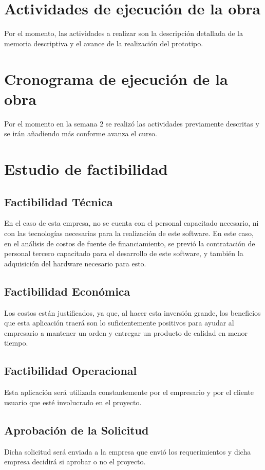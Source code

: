 \documentclass[conference]{IEEEtran}
\begin{document}
\section{Actividades de ejecución de la obra}
Por el momento, las actividades a realizar son la descripción detallada de la memoria descriptiva y el avance de la realización del prototipo.

\section{Cronograma de ejecución de la obra}
Por el momento en la semana 2 se realizó las actividades previamente descritas y se irán añadiendo más conforme avanza el curso.

\section{Estudio de factibilidad}
\subsection{Factibilidad Técnica}
En el caso de esta empresa, no se cuenta con el personal capacitado necesario, ni con las tecnologías necesarias para la realización de este software. En este caso, en el análisis de costos de fuente de financiamiento, se previó la contratación de personal tercero capacitado para el desarrollo de este software, y también la adquisición del hardware necesario para esto.

\subsection{Factibilidad Económica}
Los costos están justificados, ya que, al hacer esta inversión grande, los beneficios que esta aplicación traerá son lo suficientemente positivos para ayudar al empresario a mantener un orden y entregar un producto de calidad en menor tiempo.

\subsection{Factibilidad Operacional}
Esta aplicación será utilizada constantemente por el empresario y por el cliente usuario que esté involucrado en el proyecto.

\subsection{Aprobación de la Solicitud}
Dicha solicitud será enviada a la empresa que envió los requerimientos y dicha empresa decidirá si aprobar o no el proyecto.
\end{document}
